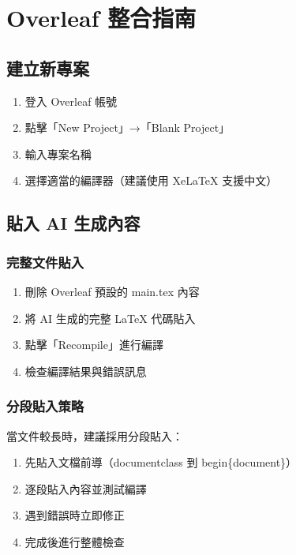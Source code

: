 \documentclass[12pt,a4paper]{article}
\begin{document}
\section{Overleaf 整合指南}

\subsection{建立新專案}

\begin{enumerate}
    \item 登入 Overleaf 帳號
    \item 點擊「New Project」→「Blank Project」
    \item 輸入專案名稱
    \item 選擇適當的編譯器（建議使用 XeLaTeX 支援中文）
\end{enumerate}

\subsection{貼入 AI 生成內容}

\subsubsection{完整文件貼入}

\begin{enumerate}
    \item 刪除 Overleaf 預設的 main.tex 內容
    \item 將 AI 生成的完整 LaTeX 代碼貼入
    \item 點擊「Recompile」進行編譯
    \item 檢查編譯結果與錯誤訊息
\end{enumerate}

\subsubsection{分段貼入策略}

當文件較長時，建議採用分段貼入：

\begin{enumerate}
    \item 先貼入文檔前導（documentclass 到 begin\{document\}）
    \item 逐段貼入內容並測試編譯
    \item 遇到錯誤時立即修正
    \item 完成後進行整體檢查
\end{enumerate}
\end{document}
